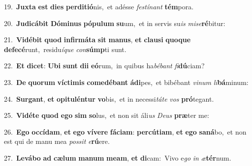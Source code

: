 {{\numbfont\textcolor{\numbcolor}{19.}}~\-\textbf{Jux}\-\textbf{ta} \textbf{est} \textbf{di}\-\textbf{es} \textbf{per}\-\textbf{di}\textbf{ti}\textbf{ó}nis,~\star et adésse \textit{fes}\-\textit{tí}\textit{nant} \textbf{tém}\-pora.\par
{\numbfont\textcolor{\numbcolor}{20.}}~\-\textbf{Ju}\-\textbf{di}\textbf{cá}\textbf{bit} \textbf{Dó}\-\textbf{mi}\textbf{nus} \textbf{pó}\-\textbf{pu}\textbf{lum} \textbf{su}\-um,~\star et in servis su\textit{is} \textit{mi}\-\textit{se}\textbf{ré}bitur:\par
{\numbfont\textcolor{\numbcolor}{21.}}~\-\textbf{Vi}\-\textbf{dé}\textbf{bit} \textbf{quod} \textbf{in}\-\textbf{fir}\textbf{má}\textbf{ta} \textbf{sit} \textbf{ma}\-\textbf{nus}, \textbf{et} \textbf{clau}\-\textbf{si} \textbf{quo}\-\textbf{que} \textbf{de}\-\textbf{fe}\textbf{cé}runt,~\star residu\-\textit{í}\-\textit{que} \textit{con}\-\textbf{súmp}ti sunt.\par
{\numbfont\textcolor{\numbcolor}{22.}}~\textbf{Et} \textbf{di}\-\textbf{cet}: \textbf{U}\-\textbf{bi} \textbf{sunt} \textbf{di}\-\textbf{i} \textbf{e}\-\textbf{ó}rum,~\star in quibus ha\-\textit{bé}\-\textit{bant} \textit{fi}\-\textbf{dú}ciam?\par
{\numbfont\textcolor{\numbcolor}{23.}}~\textbf{De} \textbf{quo}\-\textbf{rum} \textbf{víc}\-\textbf{ti}\textbf{mis} \textbf{com}\-\textbf{e}\textbf{dé}\textbf{bant} \textbf{á}\-\textbf{di}pes,~\star et bibébant \textit{vi}\-\textit{num} \textit{li}\-\textbf{bá}minum:\par
{\numbfont\textcolor{\numbcolor}{24.}}~\-\textbf{Sur}\-\textbf{gant}, \textbf{et} \textbf{o}\-\textbf{pi}\textbf{tu}\textbf{lén}\textbf{tur} \textbf{vo}\-bis,~\star et in necessi\-\textit{tá}\-\textit{te} \textit{vos} \textbf{pró}\-tegant.\par
{\numbfont\textcolor{\numbcolor}{25.}}~\-\textbf{Vi}\-\textbf{dé}\textbf{te} \textbf{quod} \textbf{e}\-\textbf{go} \textbf{sim} \textbf{so}\-lus,~\star et non sit áli\textit{us} \textit{De}\-\textit{us} \textbf{præ}\-ter me:\par
{\numbfont\textcolor{\numbcolor}{26.}}~\-\textbf{E}\-\textbf{go} \textbf{oc}\-\textbf{cí}\textbf{dam}, \textbf{et} \textbf{e}\-\textbf{go} \textbf{ví}\-\textbf{ve}\textbf{re} \textbf{fá}\-\textbf{ci}\textbf{am}: \textbf{per}\-\textbf{cú}\textbf{ti}\textbf{am}, \textbf{et} \textbf{e}\-\textbf{go} \textbf{sa}\-\textbf{ná}bo,~\star et non est qui de manu mea \textit{pos}\-\textit{sit} \textit{e}\-\textbf{rú}ere.\par
{\numbfont\textcolor{\numbcolor}{27.}}~\-\textbf{Le}\-\textbf{vá}\textbf{bo} \textbf{ad} \textbf{cæ}\-\textbf{lum} \textbf{ma}\-\textbf{num} \textbf{me}\-\textbf{am}, \textbf{et} \textbf{di}\-cam:~\star Vivo e\textit{go} \textit{in} \textit{æ}\-\textbf{tér}num.\par
}
